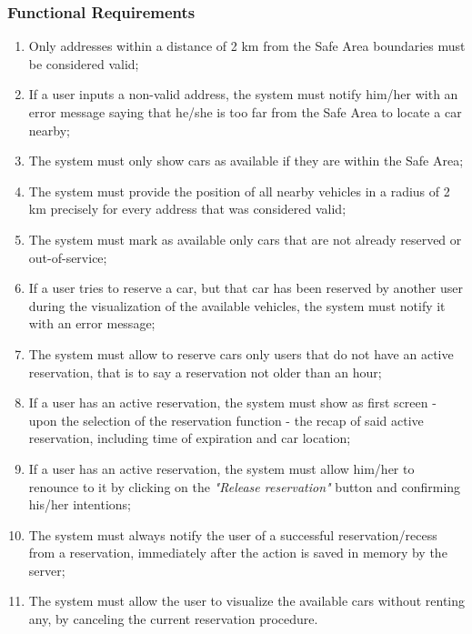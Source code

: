 \subsubsection{Functional Requirements}
\begin{enumerate}
\item Only addresses within a distance of 2 km from the Safe Area boundaries must be considered valid;
\item If a user inputs a non-valid address, the system must notify him/her with an error message saying that he/she is too far from the Safe Area to locate a car nearby;
\item The system must only show cars as available if they are within the Safe Area;
\item The system must provide the position of all nearby vehicles in a radius of 2 km precisely for every address that was considered valid;
\item The system must mark as available only cars that are not already reserved or out-of-service;
\item If a user tries to reserve a car, but that car has been reserved by another user during the visualization of the available vehicles, the system must notify it with an error message;
\item The system must allow to reserve cars only users that do not have an active reservation, that is to say a reservation not older than an hour;
\item If a user has an active reservation, the system must show as first screen - upon the selection of the reservation function - the recap of said active reservation, including time of expiration and car location;
\item If a user has an active reservation, the system must allow him/her to renounce to it by clicking on the \emph{"Release reservation"} button and confirming his/her intentions;
\item The system must always notify the user of a successful reservation/recess from a reservation, immediately after the action is saved in memory by the server;
\item The system must allow the user to visualize the available cars without renting any, by canceling the current reservation procedure.
\end{enumerate}

